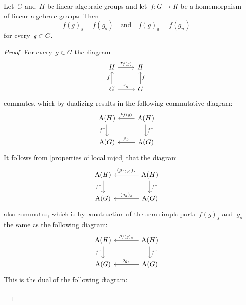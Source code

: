 \begin{lemma}
  Let~$G$ and~$H$ be linear algebraic groups and let~$f \colon G \to H$ be a homomorphism of linear algebraic groups.
  Then
  \[
      f(g)_s
    = f(g_s)
    \quad\text{and}\quad
      f(g)_u
    = f(g_u)
  \]
  for every~$g \in G$.
\end{lemma}


\begin{proof}
  For every~$g \in G$ the diagram
  \[
    \begin{tikzcd}
        H
        \arrow{r}[above]{r_{f(g)}}
      & H
      \\
        G
        \arrow{r}[above]{r_g}
        \arrow{u}[left]{f}
      & G
        \arrow{u}[right]{f}
    \end{tikzcd}
  \]
  commutes, which by dualizing results in the following commutative diagram:
  \[
    \begin{tikzcd}
        \coord(H)
        \arrow{d}[left]{f^*}
      & \coord(H)
        \arrow{l}[above]{\rho_{f(g)}}
        \arrow{d}[right]{f^*}
      \\
        \coord(G)
      & \coord(G)
        \arrow{l}[above]{\rho_g}
    \end{tikzcd}
  \]
  It follows from \cref{properties of local mjcd} that the diagram
  \[
    \begin{tikzcd}[column sep = large]
        \coord(H)
        \arrow{d}[left]{f^*}
      & \coord(H)
        \arrow{l}[above]{ (\rho_{f(g)})_s }
        \arrow{d}[right]{f^*}
      \\
        \coord(G)
      & \coord(G)
        \arrow{l}[above]{ (\rho_g)_s }
    \end{tikzcd}
  \]
  also commutes, which is by construction of the semisimple parts~$f(g)_s$ and~$g_s$ the same as the following diagram:
  \begin{equation}
    \label{comm diagram for coordinate rings}
    \begin{tikzcd}[column sep = large]
        \coord(H)
        \arrow{d}[left]{f^*}
      & \coord(H)
        \arrow{l}[above]{ \rho_{f(g)_s} }
        \arrow{d}[right]{f^*}
      \\
        \coord(G)
      & \coord(G)
        \arrow{l}[above]{ \rho_{g_s} }
    \end{tikzcd}
  \end{equation}
  This is the dual of the following diagram:
  \begin{equation}
    \label{comm diagram for groups}
    \begin{tikzcd}

\end{tikzcd}
\end{equation}
\end{proof}
